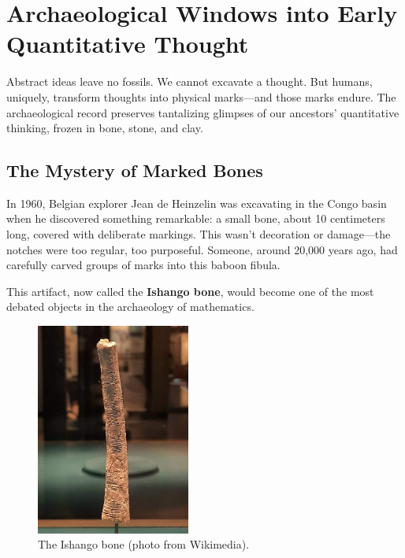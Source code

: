 \section{Archaeological Windows into Early Quantitative Thought}
\label{sec:archaeological-evidence}

\begin{sectionintro}
	Abstract ideas leave no fossils. We cannot excavate a thought. But humans, uniquely, transform thoughts into physical marks—and those marks endure. The archaeological record preserves tantalizing glimpses of our ancestors' quantitative thinking, frozen in bone, stone, and clay.
\end{sectionintro}

\subsection{The Mystery of Marked Bones}

In 1960, Belgian explorer Jean de Heinzelin was excavating in the Congo basin when he discovered something remarkable: a small bone, about 10 centimeters long, covered with deliberate markings. This wasn't decoration or damage—the notches were too regular, too purposeful. Someone, around 20,000 years ago, had carefully carved groups of marks into this baboon fibula.

This artifact, now called the \textbf{Ishango bone}, would become one of the most debated objects in the archaeology of mathematics.

\begin{figure}[h]
	\centering
	\includegraphics[width=0.45\textwidth]{images/Ishango_bone.jpg}
	\caption{The Ishango bone (photo from Wikimedia).}
	\label{fig:ishango_photo}
\end{figure}

